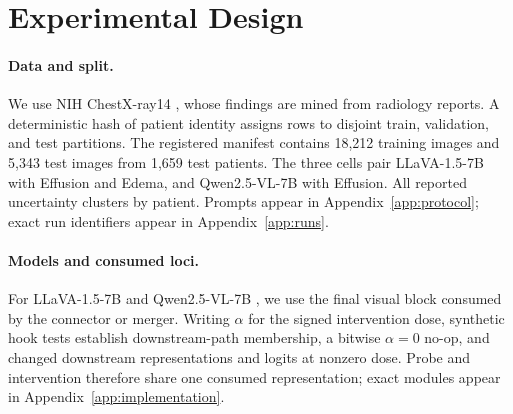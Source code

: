 \section{Experimental Design}
\label{sec:protocol}

\paragraph{Data and split.}
We use NIH ChestX-ray14 \citep{wang2017chestxray}, whose findings are mined from radiology reports. A deterministic hash of patient identity assigns rows to disjoint train, validation, and test partitions. The registered manifest contains 18,212 training images and 5,343 test images from 1,659 test patients. The three cells pair LLaVA-1.5-7B with Effusion and Edema, and Qwen2.5-VL-7B with Effusion. All reported uncertainty clusters by patient. Prompts appear in Appendix~\ref{app:protocol}; exact run identifiers appear in Appendix~\ref{app:runs}.

\paragraph{Models and consumed loci.}
For LLaVA-1.5-7B \citep{liu2024improved} and Qwen2.5-VL-7B \citep{bai2025qwen25vl}, we use the final visual block consumed by the connector or merger. Writing $\alpha$ for the signed intervention dose, synthetic hook tests establish downstream-path membership, a bitwise $\alpha=0$ no-op, and changed downstream representations and logits at nonzero dose. Probe and intervention therefore share one consumed representation; exact modules appear in Appendix~\ref{app:implementation}.

